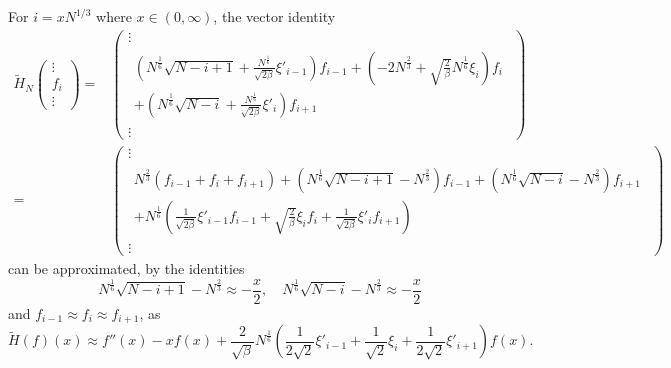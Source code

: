 \documentclass[11pt, a4paper]{article}
\numberwithin{equation}{section}
\theoremstyle{definition}
\theoremstyle{remark}
\begin{document}
For $i = x N^{1/3}$ where $x \in (0, \infty)$, the vector identity
\begin{equation}
  \begin{split}
    \tilde{H}_N
    \begin{pmatrix}
      \vdots \\
      f_i \\
      \vdots
    \end{pmatrix}
    = {}&
    \begin{pmatrix}
      \vdots \\
      \begin{gathered}
        (N^{\frac{1}{6}} \sqrt{N - i + 1} + \frac{N^{\frac{1}{6}}}{\sqrt{2\beta}} \xi'_{i - 1}) f_{i - 1} + (-2N^{\frac{2}{3}} + \sqrt{\frac{2}{\beta}} N^{\frac{1}{6}} \xi_i) f_i \\
        + (N^{\frac{1}{6}} \sqrt{N - i} + \frac{N^{\frac{1}{6}}}{\sqrt{2\beta}} \xi'_i) f_{i + 1}
      \end{gathered} \\
      \vdots
    \end{pmatrix} \\
    = {}&
    \begin{pmatrix}
      \vdots \\
      \begin{gathered}
        N^{\frac{2}{3}} (f_{i - 1} + f_i + f_{i + 1}) + (N^{\frac{1}{6}} \sqrt{N - i + 1} - N^{\frac{2}{3}}) f_{i - 1} + (N^{\frac{1}{6}} \sqrt{N - i} - N^{\frac{2}{3}}) f_{i + 1} \\
        + N^{\frac{1}{6}} \left( \frac{1}{\sqrt{2\beta}} \xi'_{i - 1} f_{i - 1} + \sqrt{\frac{2}{\beta}} \xi_i f_i + \frac{1}{\sqrt{2\beta}} \xi'_i f_{i + 1} \right) 
      \end{gathered} \\
      \vdots
    \end{pmatrix}
  \end{split}
\end{equation}
can be approximated, by the identities
\begin{equation}
  N^{\frac{1}{6}} \sqrt{N - i + 1} - N^{\frac{2}{3}} \approx -\frac{x}{2}, \quad N^{\frac{1}{6}} \sqrt{N - i} - N^{\frac{2}{3}} \approx -\frac{x}{2}
\end{equation}
and $f_{i - 1} \approx f_i \approx f_{i + 1}$, as
\begin{equation} \label{eq:approx_of_tilde_H_N}
  \tilde{H}(f)(x) \approx f''(x) - x f(x) + \frac{2}{\sqrt{\beta}} N^{\frac{1}{6}} \left(\frac{1}{2\sqrt{2}} \xi'_{i - 1} + \frac{1}{\sqrt{2}} \xi_i + \frac{1}{2\sqrt{2}} \xi'_{i + 1} \right) f(x).
\end{equation}
\end{document}
